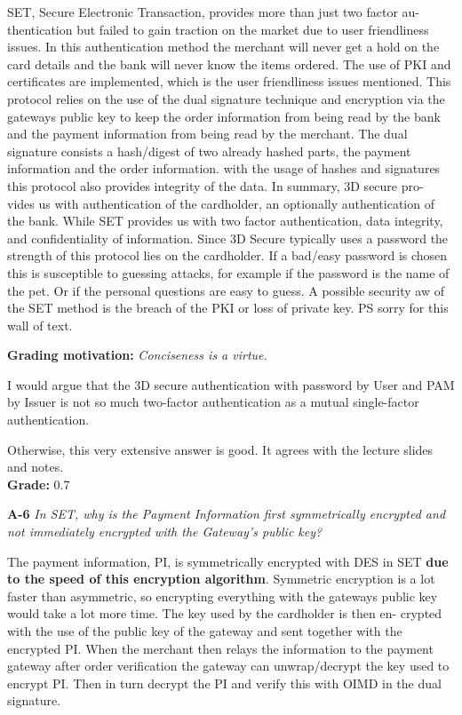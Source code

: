 \documentclass[a4paper]{article}
\newcommand{\Q}[2]{
  \vspace{10pt} \textbf{#1} \textit{#2}
 }
\newcommand{\A}[1]{ #1 }
\newcommand{\Grade}[2]{ 
  \textbf{Grading motivation:} #2 \\ 
  \hspace*{\fill} \textbf{Grade:} #1 
}
\begin{document}
{  SET, Secure Electronic Transaction, provides more than just two factor au-
  thentication but failed to gain traction on the market due to user friendliness
  issues. In this authentication method the merchant will never get a hold on the
  card details and the bank will never know the items ordered. The use of PKI
  and certificates are implemented, which is the user friendliness issues mentioned.
  This protocol relies on the use of the dual signature technique and encryption
  via the gateways public key to keep the order information from being read by
  the bank and the payment information from being read by the merchant. The
  dual signature consists a hash/digest of two already hashed parts, the payment
  information and the order information. with the usage of hashes and signatures
  this protocol also provides integrity of the data. In summary, 3D secure pro-
  vides us with authentication of the cardholder, an optionally authentication of
  the bank. While SET provides us with two factor authentication, data integrity,
  and confidentiality of information. Since 3D Secure typically uses a password
  the strength of this protocol lies on the cardholder. If a bad/easy password is
  chosen this is susceptible to guessing attacks, for example if the password is the
  name of the pet. Or if the personal questions are easy to guess. A possible
  security 
  aw of the SET method is the breach of the PKI or loss of private key.
  PS sorry for this wall of text.
}

\Grade{0.7}{
  \textit{Conciseness is a virtue.}

  I would argue that the 3D secure authentication with password by
  User and PAM by Issuer is not so much two-factor authentication
  as a mutual single-factor authentication.

  Otherwise, this very extensive answer is good. It agrees with the lecture
  slides and notes.
}

\Q{A-6} {In SET, why is the Payment Information first symmetrically encrypted
and not immediately encrypted with the Gateway's public key?}

\A{
  The payment information, PI, is symmetrically encrypted with DES in SET
  \textbf{due to the speed of this encryption algorithm}. Symmetric encryption is
  a lot faster than asymmetric, so encrypting everything with the gateways public
  key would take a lot more time. The key used by the cardholder is then en-
  crypted with the use of the public key of the gateway and sent together with the
  encrypted PI. When the merchant then relays the information to the payment
  gateway after order verification the gateway can unwrap/decrypt the key used
  to encrypt PI. Then in turn decrypt the PI and verify this with OIMD in the
  dual signature.
}
\end{document}
